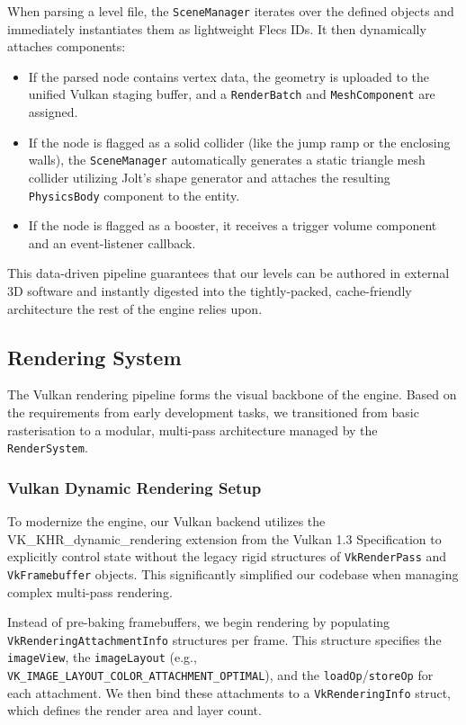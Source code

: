 \documentclass[acmtog, nonacm]{acmart}
\begin{document}
When parsing a level file, the \texttt{SceneManager} iterates over the defined objects and immediately instantiates them as lightweight Flecs IDs. It then dynamically attaches components:
\begin{itemize}
    \item If the parsed node contains vertex data, the geometry is uploaded to the unified Vulkan staging buffer, and a \texttt{RenderBatch} and \texttt{MeshComponent} are assigned.
    \item If the node is flagged as a solid collider (like the jump ramp or the enclosing walls), the \texttt{SceneManager} automatically generates a static triangle mesh collider utilizing Jolt's shape generator and attaches the resulting \texttt{PhysicsBody} component to the entity.
    \item If the node is flagged as a booster, it receives a trigger volume component and an event-listener callback.
\end{itemize}

This data-driven pipeline guarantees that our levels can be authored in external 3D software and instantly digested into the tightly-packed, cache-friendly architecture the rest of the engine relies upon.

\subsection{Rendering System}
The Vulkan rendering pipeline forms the visual backbone of the engine. Based on the requirements from early development tasks, we transitioned from basic rasterisation to a modular, multi-pass architecture managed by the \texttt{RenderSystem}. 

\subsubsection{Vulkan Dynamic Rendering Setup}
To modernize the engine, our Vulkan backend utilizes the VK\_KHR\_dynamic\_rendering extension from the Vulkan 1.3 Specification \cite{VulkanSpec} to explicitly control state without the legacy rigid structures of \texttt{VkRenderPass} and \texttt{VkFramebuffer} objects. This significantly simplified our codebase when managing complex multi-pass rendering. 

Instead of pre-baking framebuffers, we begin rendering by populating \texttt{VkRenderingAttachmentInfo} structures per frame. This structure specifies the \texttt{imageView}, the \texttt{imageLayout} (e.g., \texttt{VK\_IMAGE\_LAYOUT\_COLOR\_ATTACHMENT\_OPTIMAL}), and the \texttt{loadOp}/\texttt{storeOp} for each attachment. We then bind these attachments to a \texttt{VkRenderingInfo} struct, which defines the render area and layer count. 
\end{document}
